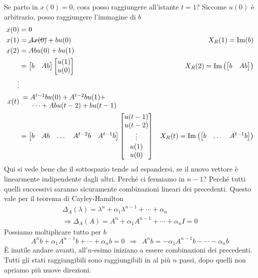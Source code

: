 \documentclass[10pt,a4paper]{book}
\begin{document}
Se parto in $x( 0) =0$, cosa posso raggiungere all'istante $t=1$? Siccome $u( 0)$ è arbitrario, posso raggiungere l'immagine di $b$
\begin{equation*}
\begin{aligned}
x( 0) & =0 & \\
x( 1) & =\cancel{Ax( 0)} +bu( 0) & X_R( 1) =\mathrm{Im}( b)\\
x( 2) & =Abu( 0) +bu( 1) & \\
 & =\begin{bmatrix}
b & Ab
\end{bmatrix}\begin{bmatrix}
u( 1)\\
u( 0)
\end{bmatrix} & X_R( 2) =\mathrm{Im}\left(\begin{bmatrix}
b & Ab
\end{bmatrix}\right)\\
\vdots  &  & \\
x(t) &  \begin{array}{l}
=A^{t-1} bu( 0) +A^{t-2} bu( 1) +\\
\ \ \ \ \cdots +Abu( t-2) +bu( t-1)
\end{array} & \\
 & =\begin{bmatrix}
b & Ab & \dotsc  & A^{t-2} b & A^{t-1} b
\end{bmatrix}\begin{bmatrix}
u( t-1)\\
u( t-2)\\
\vdots \\
u( 1)\\
u( 0)
\end{bmatrix} & X_R(t) =\mathrm{Im}\left(\begin{bmatrix}
b & \dotsc  & A^{t-1} b
\end{bmatrix}\right)
\end{aligned}
\end{equation*}
Qui si vede bene che il sottospazio tende ad espandersi, se il nuovo vettore è linearmente indipendente dagli altri. Perché ci fermiamo in $n-1$? Perché tutti quelli successivi saranno sicuramente combinazioni lineari dei precedenti. Questo vale per il teorema di Cayley-Hamilton
\begin{gather*}
\Delta _A( \lambda ) =\lambda ^{n} +\alpha _1 \lambda ^{n-1} +\cdots +\alpha _n\\
\Rightarrow \Delta _A( A) =A^{n} +\alpha _1 A^{n-1} +\cdots +\alpha _n I=0
\end{gather*}
Possiamo moltiplicare tutto per $b$
\begin{equation*}
A^{n} b+\alpha _1 A^{n-1} b+\cdots +\alpha _n b=0\ \ \Rightarrow \ \ A^{n} b=-\alpha _1 A^{n-1} b-\cdots -\alpha _n b
\end{equation*}
È inutile andare avanti, all'$n$-esimo iniziano a essere combinazioni dei precedenti. Tutti gli stati raggiungibili sono raggiungibili in al più $n$ passi, dopo quelli non apriamo più nuove direzioni.
\end{document}

